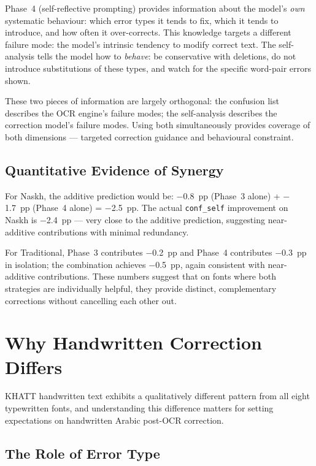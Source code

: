 Phase~4 (self-reflective prompting) provides information about the model's
\emph{own} systematic behaviour: which error types it tends to fix, which it
tends to introduce, and how often it over-corrects. This knowledge targets a
different failure mode: the model's intrinsic tendency to modify correct text.
The self-analysis tells the model how to \emph{behave}: be conservative with
deletions, do not introduce substitutions of these types, and watch for the
specific word-pair errors shown.

These two pieces of information are largely orthogonal: the confusion list
describes the OCR engine's failure modes; the self-analysis describes the
correction model's failure modes. Using both simultaneously provides coverage
of both dimensions --- targeted correction guidance and behavioural constraint.

\subsection{Quantitative Evidence of Synergy}
\label{subsec:disc_comp_quant}

For Naskh, the additive prediction would be:
$-$0.8~pp (Phase~3 alone) + $-$1.7~pp (Phase~4 alone) = $-$2.5~pp.
The actual \texttt{conf\_self} improvement on Naskh is $-$2.4~pp --- very
close to the additive prediction, suggesting near-additive contributions
with minimal redundancy.

For Traditional, Phase~3 contributes $-$0.2~pp and Phase~4 contributes
$-$0.3~pp in isolation; the combination achieves $-$0.5~pp, again consistent
with near-additive contributions. These numbers suggest that on fonts where
both strategies are individually helpful, they provide distinct, complementary
corrections without cancelling each other out.

\section{Why Handwritten Correction Differs}
\label{sec:disc_why_handwritten}

KHATT handwritten text exhibits a qualitatively different pattern from all
eight typewritten fonts, and understanding this difference matters for
setting expectations on handwritten Arabic post-OCR correction.

\subsection{The Role of Error Type}
\label{subsec:disc_hw_error_type}

